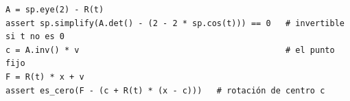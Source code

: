 %
\begin{lstlisting}
A = sp.eye(2) - R(t)
assert sp.simplify(A.det() - (2 - 2 * sp.cos(t))) == 0   # invertible si t no es 0
c = A.inv() * v                                          # el punto fijo
F = R(t) * x + v
assert es_cero(F - (c + R(t) * (x - c)))   # rotación de centro c
\end{lstlisting}
\comprobacionPie

